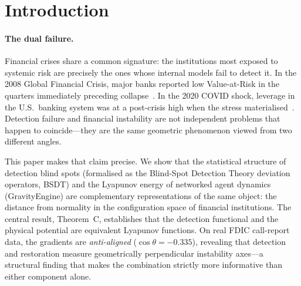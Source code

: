 \documentclass[11pt]{article}
\theoremstyle{definition}
\newcommand{\Cman}{\mathcal{C}}
\newcommand{\costheta}{\cos\theta}
\begin{document}
\begin{abstract}
$\alpha = 0.10$ on domestic data, confirming the phase-transition thesis---crises
are threshold crossings, not linearly predictable trends.  On the cross-border
G-SIB panel, however, threshold Granger causality \emph{passes} ($p = 0.043$),
suggesting that international contagion introduces temporal lags that create
linear predictability absent in domestic phase transitions.
The Signed~LR variant discovers that
pre-crisis periods are characterised by \emph{decreased} temporal novelty
($\beta_{\delta_T} = -1.38$)---the quantitative signature of convergent herding.
Together these results justify state-contingent macroprudential policy as the
minimal intervention above $\Cman$, calibrated to a consumption-equivalent
welfare loss of 19.57~pp for the GFC and a peak CCyB of 231~bps for COVID.
\end{abstract}

\tableofcontents
\newpage

\section{Introduction}
\label{sec:intro}

\paragraph{The dual failure.}
Financial crises share a common signature: the institutions most exposed to systemic
risk are precisely the ones whose internal models fail to detect it.  In the 2008
Global Financial Crisis, major banks reported low Value-at-Risk in the quarters
immediately preceding collapse~\citep{brunnermeier2009deciphering}.  In the 2020
COVID shock, leverage in the U.S.\ banking system was at a post-crisis high
when the stress materialised~\citep{greenwald2020financial}.  Detection failure
and financial instability are not independent problems that happen to coincide---they
are the same geometric phenomenon viewed from two different angles.

This paper makes that claim precise.  We show that the statistical structure of
detection blind spots (formalised as the Blind-Spot Detection Theory deviation
operators, BSDT) and the Lyapunov energy of networked agent dynamics (GravityEngine)
are complementary representations of the same object: the distance from normality in
the configuration space of financial institutions.  The central result,
Theorem~C, establishes that the detection functional and the physical potential
are equivalent Lyapunov functions.  On real FDIC call-report data, the gradients are
\emph{anti-aligned} ($\costheta = -0.335$), revealing that detection and restoration
measure geometrically perpendicular instability axes---a structural finding that makes
the combination strictly more informative than either component alone.
\end{document}

